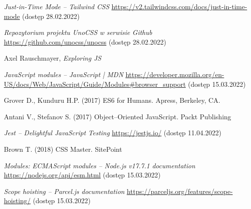 \documentclass{SGGW-thesis}
\begin{document}
\begin{thebibliography}{9}
\textit{Just-in-Time Mode -- Tailwind CSS}
\url{https://v2.tailwindcss.com/docs/just-in-time-mode} (dostęp 28.02.2022)

\textit{Repozytorium projektu UnoCSS w serwisie Github}
\url{https://github.com/unocss/unocss} (dostęp 28.02.2022)

Axel Rauschmayer, \textit{Exploring JS}

\textit{JavaScript modules -- JavaScript | MDN}
\url{https://developer.mozilla.org/en-US/docs/Web/JavaScript/Guide/Modules#browser_support} (dostęp 15.03.2022)

Grover D., Kunduru H.P. (2017) ES6 for Humans. Apress, Berkeley, CA.

Antani V., Stefanov S. (2017) Object--Oriented JavaScript. Packt Publishing

\textit{Jest -- Delightful JavaScript Testing}
\url{https://jestjs.io/} (dostęp 11.04.2022)

Brown T. (2018) CSS Master. SitePoint

\textit{Modules: ECMAScript modules -- Node.js v17.7.1 documentation}
\url{https://nodejs.org/api/esm.html} (dostęp 15.03.2022)

\textit{Scope hoisting -- Parcel.js documentation}
\url{https://parceljs.org/features/scope-hoisting/} (dostęp 15.03.2022)

\end{thebibliography}

\beforelastpage
\end{document}
